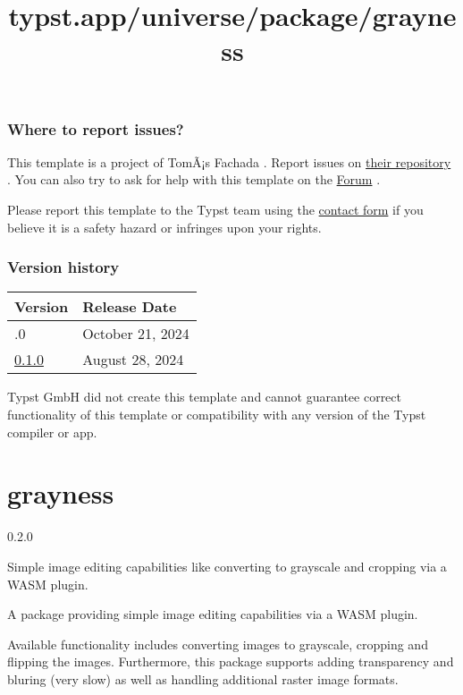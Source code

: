 \subsubsection{Where to report issues?}\label{where-to-report-issues}

This template is a project of TomÃ¡s Fachada . Report issues on
\href{https://github.com/tfachada/thesist}{their repository} . You can
also try to ask for help with this template on the
\href{https://forum.typst.app}{Forum} .

Please report this template to the Typst team using the
\href{https://typst.app/contact}{contact form} if you believe it is a
safety hazard or infringes upon your rights.

\label{versions}
\subsubsection{Version history}\label{version-history}

\begin{longtable}[]{@{}ll@{}}
\toprule\noalign{}
Version & Release Date \\
\midrule\noalign{}
\endhead
\bottomrule\noalign{}
\endlastfoot
0.2.0 & October 21, 2024 \\
\href{https://typst.app/universe/package/thesist/0.1.0/}{0.1.0} & August
28, 2024 \\
\end{longtable}

Typst GmbH did not create this template and cannot guarantee correct
functionality of this template or compatibility with any version of the
Typst compiler or app.


\title{typst.app/universe/package/grayness}

\label{banner}
\section{grayness}\label{grayness}

{ 0.2.0 }

Simple image editing capabilities like converting to grayscale and
cropping via a WASM plugin.

\label{readme}
A package providing simple image editing capabilities via a WASM plugin.

Available functionality includes converting images to grayscale,
cropping and flipping the images. Furthermore, this package supports
adding transparency and bluring (very slow) as well as handling
additional raster image formats.


